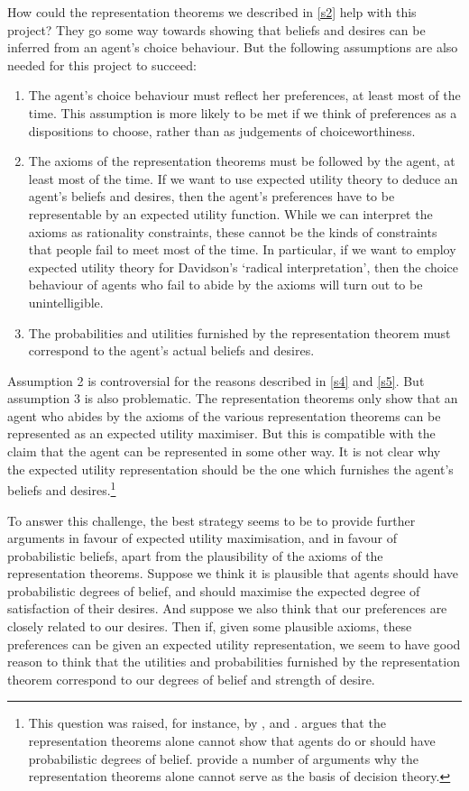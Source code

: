 How could the representation theorems we described in \autoref{s2} help with this project? They go some way towards showing that beliefs and desires can be inferred from an agent's choice behaviour. But the following assumptions are also needed for this project to succeed:
\begin{enumerate}
\item The agent's choice behaviour must reflect her preferences, at least most of the time. This assumption is more likely to be met if we think of preferences as a dispositions to choose, rather than as judgements of choiceworthiness.
\item The axioms of the representation theorems must be followed by the agent, at least most of the time. If we want to use expected utility theory to deduce an agent's beliefs and desires, then the agent's preferences have to be representable by an expected utility function. While we can interpret the axioms as rationality constraints, these cannot be the kinds of constraints that people fail to meet most of the time. In particular, if we want to employ expected utility theory for Davidson's `radical interpretation', then the choice behaviour of agents who fail to abide by the axioms will turn out to be unintelligible.
\item The probabilities and utilities furnished by the representation theorem must correspond to the agent's actual beliefs and desires.
\end{enumerate}

Assumption 2 is controversial for the reasons described in \autoref{s4} and \autoref{s5}. But assumption 3 is also problematic. The representation theorems only show that an agent who abides by the axioms of the various representation theorems can be represented as an expected utility maximiser. But this is compatible with the claim that the agent can be represented in some other way. It is not clear why the expected utility representation should be the one which furnishes the agent's beliefs and desires.\footnote{This question was raised, for instance, by \citet{Zynda2000}, \citet{Hajek2008:thoma} and \citet{MeachamWeisberg2011}. \citet{Zynda2000} argues that the representation theorems alone cannot show that agents do or should have probabilistic degrees of belief. \citet{MeachamWeisberg2011} provide a number of arguments why the representation theorems alone cannot serve as the basis of decision theory.}

To answer this challenge, the best strategy seems to be to provide further arguments in favour of expected utility maximisation, and in favour of probabilistic beliefs, apart from the plausibility of the axioms of the representation theorems. Suppose we think it is plausible that agents should have probabilistic degrees of belief, and should maximise the expected degree of satisfaction of their desires. And suppose we also think that our preferences are closely related to our desires. Then if, given some plausible axioms, these preferences can be given an expected utility representation, we seem to have good reason to think that the utilities and probabilities furnished by the representation theorem correspond to our degrees of belief and strength of desire.

